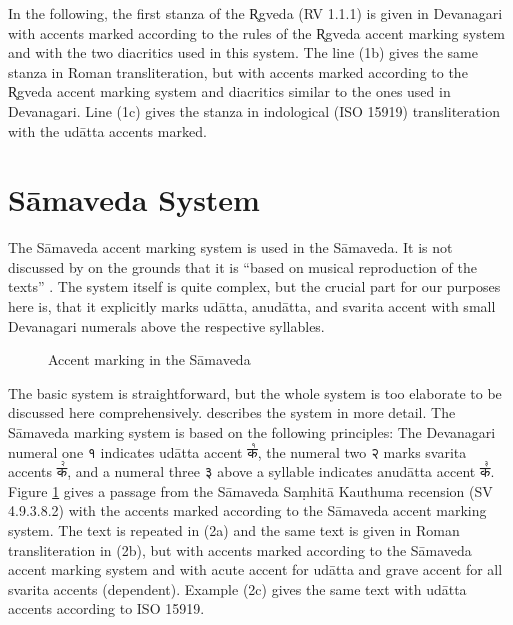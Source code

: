 In the following, the first stanza of the R̥gveda (RV 1.1.1) is given in Devanagari with accents marked according to the rules of the R̥gveda accent marking system and with the two diacritics used in this system. The line (1b) gives the same stanza in Roman transliteration, but with accents marked according to the R̥gveda accent marking system and diacritics similar to the ones used in Devanagari. Line (1c) gives the stanza in indological (ISO 15919) transliteration with the udātta accents marked.

\begin{exe}
\ex
\begin{xlist}
\end{xlist}
\end{exe}


\section{Sāmaveda System}

The Sāmaveda accent marking system is used in the Sāmaveda. It is not discussed by \citet{Witzel1974} on the grounds that it is “based on musical reproduction of the texts” \citep[p.~473]{Witzel1974}. The system itself is quite complex, but the crucial part for our purposes here is, that it explicitly marks udātta, anudātta, and svarita accent with small Devanagari numerals above the respective syllables.

\begin{figure}[!ht]
\begin{center}
\end{center}
\caption[Accent marking in the Sāmaveda]{\label{fig:SV-II-9-3-8-2}Accent marking in the Sāmaveda}
\end{figure}

The basic system is straightforward, but the whole system is too elaborate to be discussed here comprehensively. \citet[p.~19]{Scharf2007} describes the system in more detail. The Sāmaveda marking system is based on the following principles: The Devanagari numeral one {\devfont १} indicates udātta accent {\devfont क꣡}, the numeral two {\devfont २} marks svarita accents {\devfont क꣢}, and a numeral three {\devfont ३} above a syllable indicates anudātta accent {\devfont क꣣}. Figure \ref{fig:SV-II-9-3-8-2} gives a passage from the Sāmaveda Saṃhitā Kauthuma recension (SV 4.9.3.8.2) with the accents marked according to the Sāmaveda accent marking system. The text is repeated in (2a) and the same text is given in Roman transliteration in (2b), but with accents marked according to the Sāmaveda accent marking system and with acute accent for udātta and grave accent for all svarita accents (dependent). Example (2c) gives the same text with udātta accents according to ISO 15919.

